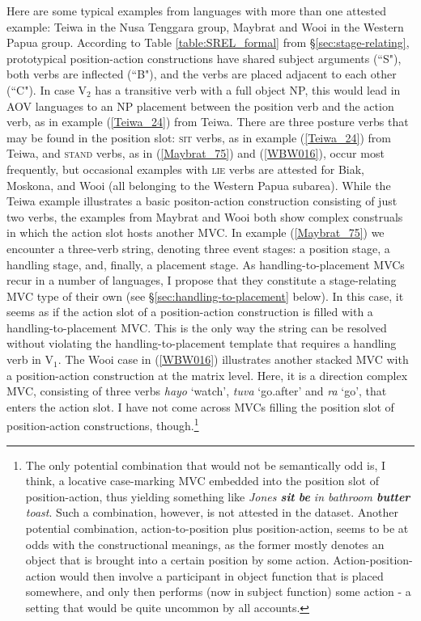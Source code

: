 Here are some typical examples from languages with more than one attested example: Teiwa in the Nusa Tenggara group, Maybrat and Wooi in the Western Papua group. According to Table \ref{table:SREL_formal} from §\ref{sec:stage-relating}, prototypical position-action constructions have shared subject arguments (``S"), both verbs are inflected (``B"), and the verbs are placed adjacent to each other (``C"). In case V$_2$ has a transitive verb with a full object NP, this would lead in AOV languages to an NP placement between the position verb and the action verb, as in example (\ref{Teiwa_24}) from Teiwa. There are three posture verbs that may be found in the position slot: \textsc{sit} verbs, as in example (\ref{Teiwa_24}) from Teiwa, and \textsc{stand} verbs, as in (\ref{Maybrat_75}) and (\ref{WBW016}), occur most frequently, but occasional examples with \textsc{lie} verbs are attested for Biak, Moskona, and Wooi (all belonging to the Western Papua subarea). While the Teiwa example illustrates a basic positon-action construction consisting of just two verbs, the examples from Maybrat and Wooi both show complex construals in which the action slot hosts another MVC. In example (\ref{Maybrat_75}) we encounter a three-verb string, denoting three event stages: a position stage, a handling stage, and, finally, a placement stage. As handling-to-placement MVCs recur in a number of languages, I propose that they constitute a stage-relating MVC type of their own (see §\ref{sec:handling-to-placement} below). In this case, it seems as if the action slot of a position-action construction is filled with a handling-to-placement MVC. This is the only way the string can be resolved without violating the handling-to-placement template that requires a handling verb in V$_1$. The Wooi case in (\ref{WBW016}) illustrates another stacked MVC with a position-action construction at the matrix level. Here, it is a direction complex MVC, consisting of three verbs \textit{hayo} `watch', \textit{tuva} `go.after' and \textit{ra} `go', that enters the action slot. I have not come across MVCs filling the position slot of position-action constructions, though.\footnote{The only potential combination that would not be semantically odd is, I think, a locative case-marking MVC embedded into the position slot of position-action, thus yielding something like \textit{Jones \textbf{sit} \textbf{be} in bathroom \textbf{butter} toast}. Such a combination, however, is not attested in the dataset. Another potential combination, action-to-position plus position-action, seems to be at odds with the constructional meanings, as the former mostly denotes an object that is brought into a certain position by some action. Action-position-action would then involve a participant in object function that is placed somewhere, and only then performs (now in subject function) some action - a setting that would be quite uncommon by all accounts.}

